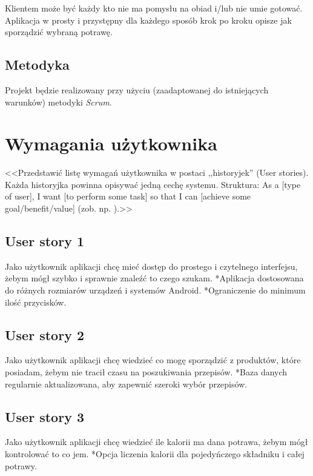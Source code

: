 \documentclass[a4paper]{article}
\begin{document}
Klientem może być każdy kto nie ma pomysłu na obiad i/lub nie umie gotować. Aplikacja w prosty i przystępny dla każdego sposób krok po kroku opisze jak sporządzić wybraną potrawę.

\subsection{Metodyka}

Projekt będzie realizowany przy użyciu (zaadaptowanej do istniejących warunków) metodyki {\em Scrum}. 

\section{Wymagania użytkownika}
<<Przedstawić listę wymagań użytkownika w postaci ,,historyjek'' (User stories). Każda historyjka powinna opisywać jedną cechę systemu. Struktura: As a [type of user], I want [to perform some task] so that I can [achieve some goal/benefit/value] (zob. np. \cite{us}).>>

\subsection{User story 1}
Jako użytkownik aplikacji chcę mieć dostęp do prostego i czytelnego interfejsu, żebym mógł szybko i sprawnie znaleźć to czego szukam. \newline
*Aplikacja dostosowana do różnych rozmiarów urządzeń i systemów Android.\newline
*Ograniczenie do minimum ilość przycisków.

\subsection{User story 2}
Jako użytkownik aplikacji chcę wiedzieć co mogę sporządzić z produktów, które posiadam, żebym nie tracił czasu na poszukiwania przepisów. \newline
*Baza danych regularnie aktualizowana, aby zapewnić szeroki wybór przepisów.

\subsection{User story 3}
Jako użytkownik aplikacji chcę wiedzieć ile kalorii ma dana potrawa, żebym mógł kontrolować to co jem. \newline
*Opcja liczenia kalorii dla pojedyńczego składniku i całej potrawy.
\end{document}
